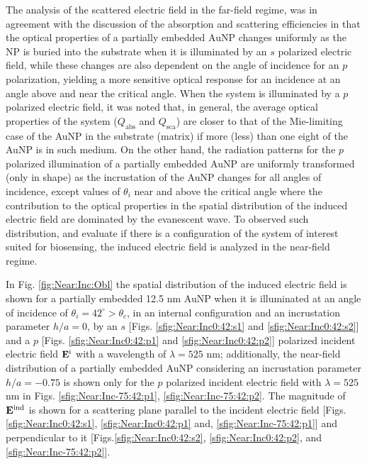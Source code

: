 The analysis of the scattered electric field in the far-field regime, was in agreement with the discussion of the absorption and scattering efficiencies in that the optical properties of a partially embedded AuNP changes uniformly as the NP is buried into the substrate when it is illuminated by an $s$ polarized electric field, while these changes are also dependent on the angle of incidence for an $p$ polarization, yielding a more sensitive optical response for an incidence at an angle above and near the critical angle. When the system is illuminated by a $p$ polarized electric field, it was noted that, in general, the average optical properties of the system ($Q_\text{abs}$ and $Q_\text{sca}$) are closer to that of the Mie-limiting case of the AuNP in the substrate (matrix) if more (less) than one eight of the AuNP is in such medium. On the other hand, the radiation patterns  for the $p$ polarized illumination of a partially embedded AuNP  are uniformly transformed (only in shape) as the incrustation of the AuNP changes for all angles of incidence, except values of $\theta_i$ near and above the critical angle where the contribution to the optical properties in the spatial distribution of the induced electric field are dominated by the evanescent wave. To observed such distribution, and evaluate if there is a configuration of the system of interest suited for biosensing, the induced electric field is analyzed in the near-field regime.

In Fig. \ref{fig:Near:Inc:Obl} the spatial distribution of the induced electric field is shown for a partially embedded 12.5 nm AuNP when it is illuminated at an angle of incidence of $\theta_i = 42^\circ>\theta_c$, in an internal configuration and an incrustation parameter $h/a = 0$, by an $s$ [Figs. \ref{sfig:Near:Inc0:42:s1} and \ref{sfig:Near:Inc0:42:s2}] and a $p$ [Figs. \ref{sfig:Near:Inc0:42:p1} and   \ref{sfig:Near:Inc0:42:p2}] polarized incident electric field $\vb{E}^\text{i}$ with a wavelength of $\lambda  =525$ nm; additionally, the near-field distribution of a partially embedded AuNP considering an incrustation parameter $h/a = -0.75$ is shown only for the $p$ polarized incident electric field with  $\lambda  =525$ nm in Figs. \ref{sfig:Near:Inc-75:42:p1},  \ref{sfig:Near:Inc-75:42:p2}.  The magnitude of $\vb{E}^\text{ind}$ is shown for a scattering plane parallel to the incident electric field [Figs. \ref{sfig:Near:Inc0:42:s1}, \ref{sfig:Near:Inc0:42:p1} and,  \ref{sfig:Near:Inc-75:42:p1}] and perpendicular to it [Figs.\ref{sfig:Near:Inc0:42:s2}, \ref{sfig:Near:Inc0:42:p2}, and \ref{sfig:Near:Inc-75:42:p2}].

